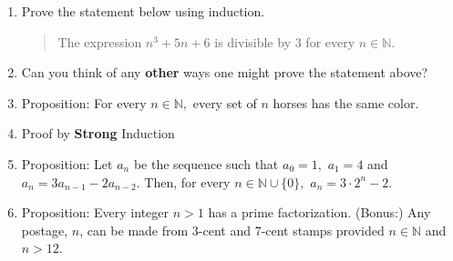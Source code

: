 \documentclass[12pt]{article}
\renewcommand{\emph}[1]{\textsf{\textbf{#1}}}
\newcommand{\N}{\mathbb{N}}
\begin{document}
\begin{enumerate}
\item Prove the statement below using induction. 
\begin{quote} The expression $n^3+5n+6$ is divisible by 3 for every $n \in \N.$\end{quote}



\vfill
\vfill
\item Can you think of any \emph{other} ways one might prove the statement above?\\

\vspace{.5in}
\item Proposition: For every $n \in \N,$ every set of $n$ horses has the same color.
\vfill
\newpage
\item Proof by \emph{Strong} Induction
\vspace{1in}
\item Proposition: Let $a_n$ be the sequence such that $a_0=1,$ $a_1=4$ and $a_n=3a_{n-1}-2a_{n-2}.$ Then, for every $n \in \N \cup \{0\},$ $a_n=3 \cdot 2^n-2.$
\vfill
\vfill

\item Proposition: Every integer $n >1$ has a prime factorization.
\vfill
(Bonus:) Any postage, $n$, can be made from 3-cent and 7-cent stamps provided $n\in \N$ and $n>12.$\end{enumerate}
\end{document}
